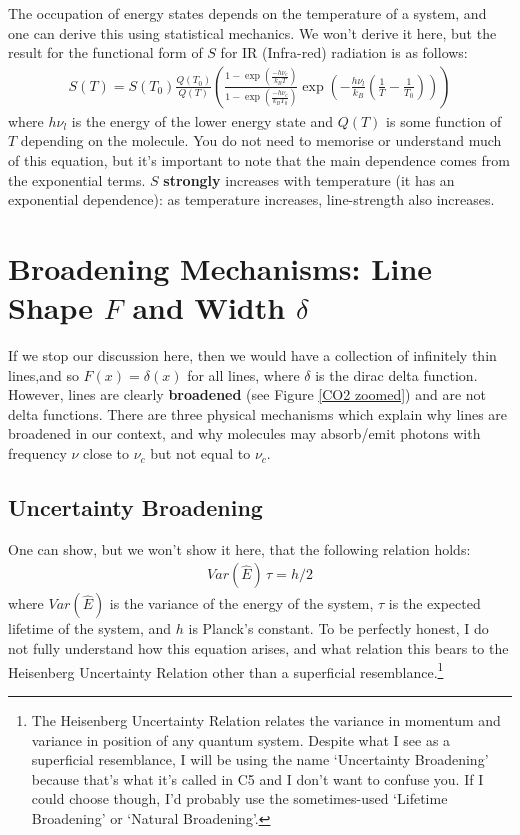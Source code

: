 The occupation of energy states depends on the temperature of a system, and one can derive this using statistical mechanics. We won't derive it here, but the result for the functional form of $S$ for IR (Infra-red) radiation is as follows:
\begin{align*}
    S(T)=S(T_0)\frac{Q(T_0)}{Q(T)}\left( 
        \frac{1-\exp\left( \frac{-h\nu_c}{k_BT} \right)}{1-\exp\left( \frac{-h\nu_c}{k_BT_0} \right)}\exp\left( 
            -\frac{h\nu_l}{k_B}\left( \frac{1}{T}-\frac{1}{T_0} \right)
         \right)
     \right)
\end{align*}
where $h\nu_l$ is the energy of the lower energy state and $Q(T)$ is some function of $T$ depending on the molecule. You do not need to memorise or understand much of this equation, but it's important to note that the main dependence comes from the exponential terms. $S$ \textbf{strongly} increases with temperature (it has an exponential dependence): as temperature increases, line-strength also increases.

\section{Broadening Mechanisms: Line Shape\texorpdfstring{ $F$}{} and Width\texorpdfstring{ $\delta$}{}}\label{Broadening}

If we stop our discussion here, then we would have a collection of infinitely thin lines,and so $F(x)=\delta(x)$ for all lines, where $\delta$ is the dirac delta function. However, lines are clearly \textbf{broadened} (see Figure \ref{CO2 zoomed}) and are not delta functions. There are three physical mechanisms which explain why lines are broadened in our context, and why molecules may absorb/emit photons with frequency $\nu$ close to $\nu_c$ but not equal to $\nu_c$.

\subsection{Uncertainty Broadening}

One can show, but we won't show it here, that the following relation holds:
\begin{align*}
    Var(\hat{E})\,\tau=h/2
\end{align*}
where $Var(\hat{E})$ is the variance of the energy of the system, $\tau$ is the expected lifetime of the system, and $h$ is Planck's constant. To be perfectly honest, I do not fully understand how this equation arises, and what relation this bears to the Heisenberg Uncertainty Relation other than a superficial resemblance.\footnote{
    The Heisenberg Uncertainty Relation relates the variance in momentum and variance in position of any quantum system. Despite what I see as a superficial resemblance, I will be using the name `Uncertainty Broadening' because that's what it's called in C5 and I don't want to confuse you. If I could choose though, I'd probably use the sometimes-used `Lifetime Broadening' or `Natural Broadening'.
}

